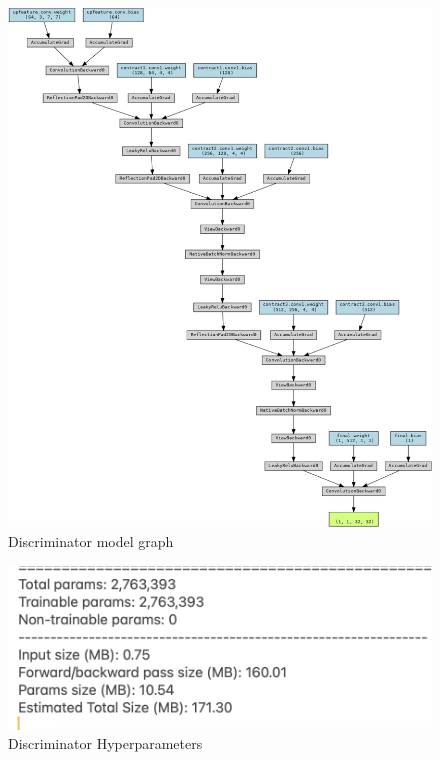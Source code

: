\documentclass[UKenglish,12pt]{master-style}
\begin{document}
\begin{figure}[htbp]
    \centering
    \includegraphics[width=1\textwidth]{Images/discriminator_visualization.png}
    \caption{Discriminator model graph}
    \label{fig:discriminator_visualization}
\end{figure}


\begin{figure}[htbp]
    \centering
    \includegraphics[width=1\textwidth]{Images/D_parameters.png}
    \caption{Discriminator Hyperparameters}
    \label{fig:D_parameters}
\end{figure}
\end{document}
